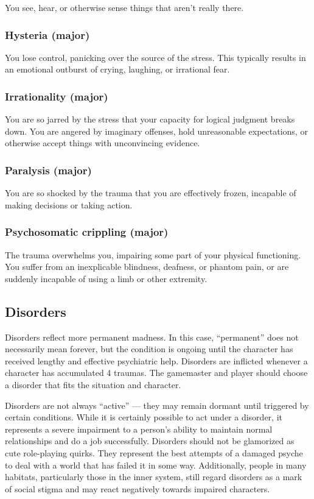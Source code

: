 You see, hear, or otherwise sense things that aren’t really there.

\subsubsection{Hysteria (major)}

You lose control, panicking over the source of the stress. This typically results in an emotional outburst of crying, laughing, or irrational fear.

\subsubsection{Irrationality (major)}

You are so jarred by the stress that your capacity for logical judgment breaks down. You are angered by imaginary offenses, hold unreasonable expectations, or otherwise accept things with unconvincing evidence.

\subsubsection{Paralysis (major)}

You are so shocked by the trauma that you are effectively frozen, incapable of making decisions or taking action.

\subsubsection{Psychosomatic crippling (major)}

The trauma overwhelms you, impairing some part of your physical functioning. You suffer from an inexplicable blindness, deafness, or phantom pain, or are suddenly incapable of using a limb or other extremity.


\subsection{Disorders}
\label{sec:disorders}

Disorders reflect more permanent madness. In this case, ``permanent” does not necessarily mean forever, but the condition is ongoing until the character has received lengthy and effective psychiatric help. Disorders are inflicted whenever a character has accumulated 4 traumas. The gamemaster and player should choose a disorder that fits the situation and character.

Disorders are not always ``active'' --- they may remain dormant until triggered by certain conditions. While it is certainly possible to act under a disorder, it represents a severe impairment to a person’s ability to maintain normal relationships and do a job successfully. Disorders should not be glamorized as cute role-playing quirks. They represent the best attempts of a damaged psyche to deal with a world that has failed it in some way. Additionally, people in many habitats, particularly those in the inner system, still regard disorders as a mark of social stigma and may react negatively towards impaired characters.

